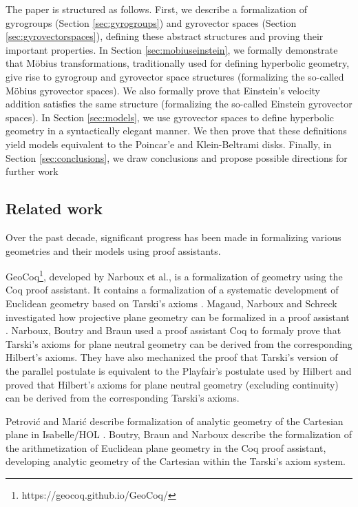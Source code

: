 \documentclass[a4paper]{article}
\theoremstyle{definition}
\begin{document}
The paper is structured as follows. First, we describe a formalization
of gyrogroups (Section \ref{sec:gyrogroups}) and gyrovector spaces
(Section \ref{sec:gyrovectorspaces}), defining these abstract
structures and proving their important properties. In Section
\ref{sec:mobiuseinstein}, we formally demonstrate that M\"obius
transformations, traditionally used for defining hyperbolic geometry,
give rise to gyrogroup and gyrovector space structures (formalizing
the so-called M\"obius gyrovector spaces). We also formally prove that
Einstein's velocity addition satisfies the same structure (formalizing
the so-called Einstein gyrovector spaces). In Section
\ref{sec:models}, we use gyrovector spaces to define hyperbolic
geometry in a syntactically elegant manner. We then prove that these
definitions yield models equivalent to the Poincar'e and
Klein-Beltrami disks. Finally, in Section \ref{sec:conclusions}, we
draw conclusions and propose possible directions for further work

\subsection{Related work}

Over the past decade, significant progress has been made in
formalizing various geometries and their models using proof
assistants.

GeoCoq\footnote{https://geocoq.github.io/GeoCoq/}, developed by
Narboux et al., is a formalization of geometry using the Coq proof
assistant. It contains a formalization of a systematic development of
Euclidean geometry based on Tarski's axioms
\cite{tarski,narboux-tarski}. Magaud, Narboux and Schreck investigated
how projective plane geometry can be formalized in a proof assistant
\cite{coq-projective}. Narboux, Boutry and Braun used a proof
assistant Coq to formaly prove that Tarski's axioms for plane neutral
geometry can be derived from the corresponding Hilbert's
axioms\cite{hilbert-to-tarski}. They have also mechanized the proof
that Tarski's version of the parallel postulate is equivalent to the
Playfair's postulate used by Hilbert\cite{coq-parallels} and proved
that Hilbert's axioms for plane neutral geometry (excluding
continuity) can be derived from the corresponding Tarski’s
axioms\cite{tarski-to-hilbert}.

Petrovi\'c and Mari\'c describe formalization of analytic geometry of
the Cartesian plane in Isabelle/HOL \cite{adg-analytic}. Boutry, Braun
and Narboux describe the formalization of the arithmetization of
Euclidean plane geometry in the Coq proof assistant, developing
analytic geometry of the Cartesian within the Tarski's axiom
system\cite{aritmetization}.
\end{document}
